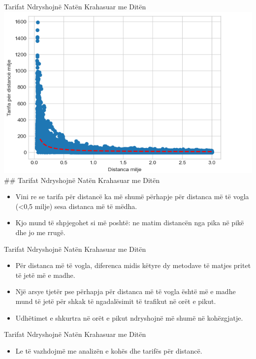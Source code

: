 \documentclass[
  ignorenonframetext,
]{beamer}
\providecommand{\tightlist}{%
  \setlength{\itemsep}{0pt}\setlength{\parskip}{0pt}}
\begin{document}
\begin{frame}{Tarifat Ndryshojnë Natën Krahasuar me Ditën}
\protect\hypertarget{tarifat-ndryshojnuxeb-natuxebn-krahasuar-me-dituxebn-8}{}
\includegraphics{./Figs/train29.png} \#\# Tarifat Ndryshojnë Natën
Krahasuar me Ditën

\begin{itemize}
\item
  Vini re se tarifa për distancë ka më shumë përhapje për distanca më të
  vogla (\textless0,5 milje) sesa distanca më të mëdha.
\item
  Kjo mund të shpjegohet si më poshtë: ne matim distancën nga pika në
  pikë dhe jo me rrugë.
\end{itemize}
\end{frame}

\begin{frame}{Tarifat Ndryshojnë Natën Krahasuar me Ditën}
\protect\hypertarget{tarifat-ndryshojnuxeb-natuxebn-krahasuar-me-dituxebn-9}{}
\begin{itemize}
\item
  Për distanca më të vogla, diferenca midis këtyre dy metodave të matjes
  pritet të jetë më e madhe.
\item
  Një arsye tjetër pse përhapja për distanca më të vogla është më e
  madhe mund të jetë për shkak të ngadalësimit të trafikut në orët e
  pikut.
\item
  Udhëtimet e shkurtra në orët e pikut ndryshojnë më shumë në
  kohëzgjatje.
\end{itemize}
\end{frame}

\begin{frame}{Tarifat Ndryshojnë Natën Krahasuar me Ditën}
\protect\hypertarget{tarifat-ndryshojnuxeb-natuxebn-krahasuar-me-dituxebn-10}{}
\begin{itemize}
\tightlist
\item
  Le të vazhdojmë me analizën e kohës dhe tarifës për distancë.
\end{itemize}
\end{frame}
\end{document}
